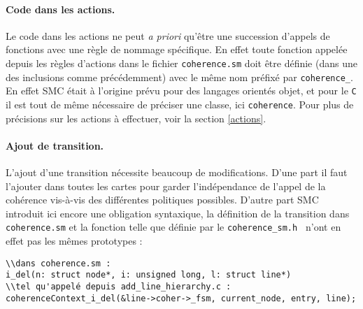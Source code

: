 \paragraph{Code dans les actions.}
Le code dans les actions ne peut \emph{a priori} qu'être une succession d'appels de fonctions avec une règle de nommage spécifique. En effet toute fonction appelée depuis les règles d'actions dans le fichier \texttt{coherence.sm} doit être définie (dans une des inclusions comme précédemment) avec le même nom préfixé par \texttt{coherence\_}. En effet \textsf{SMC} était à l'origine prévu pour des langages orientés objet, et pour le \texttt{C} il est tout de même nécessaire de préciser une classe, ici \texttt{coherence}. Pour plus de précisions sur les actions à effectuer, voir la section \ref{actions}.

\paragraph{Ajout de transition.}
L'ajout d'une transition nécessite beaucoup de modifications. D'une part il faut l'ajouter dans toutes les cartes pour garder l'indépendance de l'appel de la cohérence vis-à-vis des différentes politiques possibles. D'autre part \textsf{SMC} introduit ici encore une obligation syntaxique, la définition de la transition dans \texttt{coherence.sm} et la fonction telle que définie par le \texttt{coherence\_sm.h } n'ont en effet pas les mêmes prototypes :
\begin{framed}
\begin{verbatim}
\\dans coherence.sm :
i_del(n: struct node*, i: unsigned long, l: struct line*)
\\tel qu'appelé depuis add_line_hierarchy.c :
coherenceContext_i_del(&line->coher->_fsm, current_node, entry, line);
\end{verbatim}
\end{framed}
